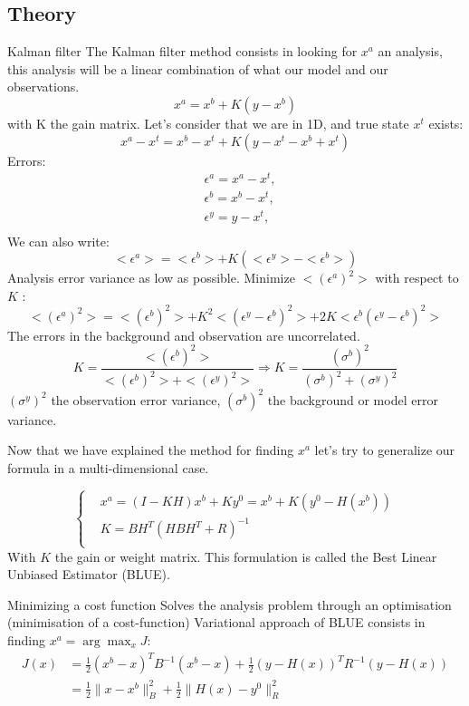 \subsection{Theory}
\begin{frame}[allowframebreaks]{Kalman filter}
    The Kalman filter method consists in looking for $x^a$ an analysis, this analysis will be a linear combination of what our model and our observations.
    $$x^a=x^b+K(y-x^b)$$
    with K the gain matrix.
    \newline Let’s consider that we are in 1D, and true state $x^t$ exists:
    $$x^a-x^t=x^b-x^t+K(y-x^t-x^b+x^t)$$
	Errors:
    $$\begin{aligned}
        &\epsilon^a=x^a-x^t, \\
        &\epsilon^b=x^b-x^t, \\
        &\epsilon^y=y-x^t, \\
    \end{aligned}$$
    \newpage
    We can also write:
    $$<\epsilon^a>=<\epsilon^b>+K(<\epsilon^y>-<\epsilon^b>)$$
    Analysis error variance as low as possible.
    \newline Minimize $<(\epsilon^a)^2>$ with respect to $K$ :
    $$<(\epsilon^a)^2>=<(\epsilon^b)^2>+K^2<(\epsilon^y-\epsilon^b)^2>+2K<\epsilon^b(\epsilon^y-\epsilon^b)^2>$$
    The errors in the background and observation are uncorrelated.
    $$K=\frac{<(\epsilon^b)^2>}{<(\epsilon^b)^2>+<(\epsilon^y)^2>} \Rightarrow K=\frac{(\sigma^b)^2}{(\sigma^b)^2+(\sigma^y)^2} $$
    $(\sigma^y)^2$ the observation error variance, \newline $(\sigma^b)^2$ the background or model error variance.

	\newpage
    Now that we have explained the method for finding $x^a$ let's try to generalize our formula in a multi-dimensional case.

    $$\left\{\begin{aligned}
  &x^a=(I-KH)x^b+Ky^0=x^b+K(y^0-H(x^b)) \\
        &K=BH^T(HBH^T+R)^{-1} \\
 \end{aligned}\right.$$
    With $K$ the gain or weight matrix.
    This formulation is called the Best Linear Unbiased Estimator (BLUE).
    \begin{figure}
    \end{figure}
\end{frame}
\begin{frame}{Minimizing a cost function}
    Solves the analysis problem through an optimisation (minimisation of a cost-function)
    Variational approach of BLUE consists in finding $x^a=\arg\max_{x}J$:
    $$\begin{aligned}
        J(x)&=\frac{1}{2}(x^b-x)^TB^{-1}(x^b-x)+\frac{1}{2}(y-H(x))^TR^{-1}(y-H(x)) \\
        &=\frac{1}{2}\|x-x^b\|_B^2+\frac{1}{2}\|H(x)-y^0\|_R^2
    \end{aligned}$$
	\begin{minipage}{\linewidth}
		\centering
	\end{minipage}
\end{frame}
